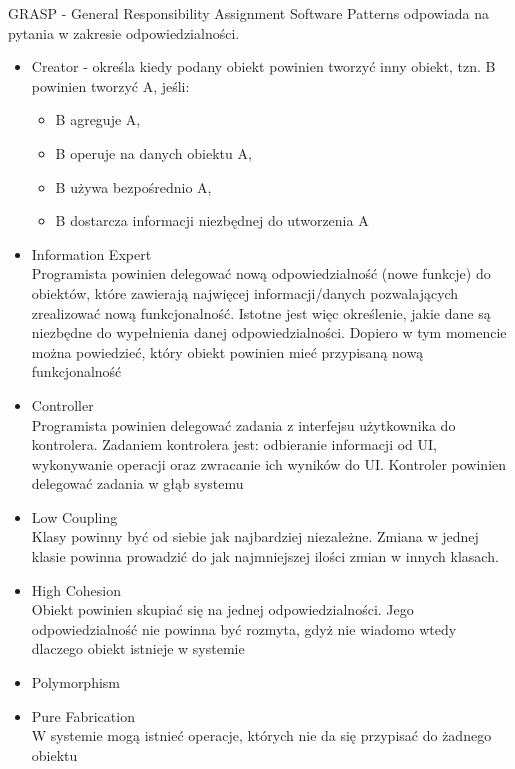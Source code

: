 \documentclass[a4paper]{article}
\begin{document}
GRASP - General Responsibility Assignment Software Patterns odpowiada na pytania w zakresie odpowiedzialności.
    \begin{itemize}
        \item Creator - określa kiedy podany obiekt powinien tworzyć inny obiekt, tzn. B powinien tworzyć A, jeśli:
        \begin{itemize}
            \item B agreguje A,
            \item B operuje na danych obiektu A,
            \item B używa bezpośrednio A,
            \item B dostarcza informacji niezbędnej do utworzenia A
        \end{itemize}
        \item Information Expert\\
        Programista powinien delegować nową
        odpowiedzialność (nowe funkcje) do obiektów, które
        zawierają najwięcej informacji/danych
        pozwalających zrealizować nową funkcjonalność.
        Istotne jest więc określenie, jakie dane są niezbędne
        do wypełnienia danej odpowiedzialności. Dopiero w
        tym momencie można powiedzieć, który obiekt
        powinien mieć przypisaną nową funkcjonalność
        \item Controller\\
        Programista powinien delegować zadania z interfejsu
        użytkownika do kontrolera.
        Zadaniem kontrolera jest: odbieranie informacji od UI,
        wykonywanie operacji oraz zwracanie ich wyników
        do UI. Kontroler powinien delegować zadania w głąb
        systemu
        \item Low Coupling\\
        Klasy powinny być od siebie jak najbardziej
        niezależne. Zmiana w jednej klasie powinna
        prowadzić do jak najmniejszej ilości zmian w innych
        klasach.
        \item High Cohesion\\
        Obiekt powinien skupiać się na jednej
        odpowiedzialności. Jego odpowiedzialność nie
        powinna być rozmyta, gdyż nie wiadomo
        wtedy dlaczego obiekt istnieje w systemie
        \item Polymorphism
        \item Pure Fabrication\\
        W systemie mogą istnieć operacje, których nie
        da się przypisać do żadnego obiektu

\end{itemize}
\end{document}
